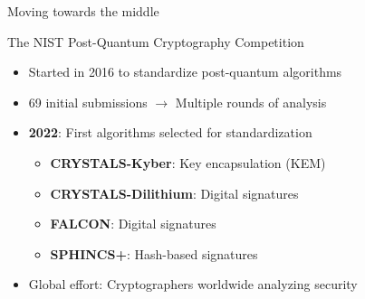 \documentclass[aspectratio=169, lualatex]{beamer} %
\begin{document}
\begin{frame}{Moving towards the middle}
\end{frame}


\begin{frame}{The NIST Post-Quantum Cryptography Competition}
	\begin{itemize}
		\item Started in 2016 to standardize post-quantum algorithms
		\item 69 initial submissions $\rightarrow$ Multiple rounds of analysis
		\item \textbf{2022}: First algorithms selected for standardization
		      \begin{itemize}
			      \item \textbf{CRYSTALS-Kyber}: Key encapsulation (KEM)
			      \item \textbf{CRYSTALS-Dilithium}: Digital signatures
			      \item \textbf{FALCON}: Digital signatures
			      \item \textbf{SPHINCS+}: Hash-based signatures
		      \end{itemize}
		\item Global effort: Cryptographers worldwide analyzing security
	\end{itemize}
\end{frame}
\end{document}
